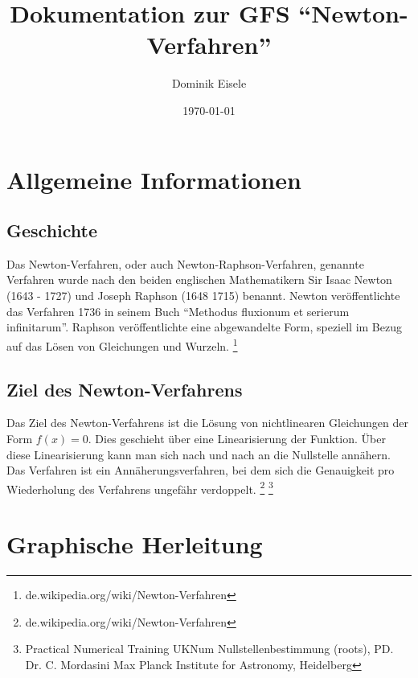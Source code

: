 \documentclass[a4paper,12pt,fleqn,oneside]{article}
\author{Dominik Eisele}
\title{Dokumentation zur GFS "`Newton-Verfahren"'}
\date{\today}
\begin{document}
\normalem

\begin{titlepage}
	\maketitle
\end{titlepage}

\tableofcontents

\newpage

\section{Allgemeine Informationen}
	\subsection{Geschichte}
		Das Newton-Verfahren, oder auch Newton-Raphson-Verfahren, genannte Verfahren wurde nach den beiden englischen Mathematikern Sir 
		Isaac Newton (1643 - 1727) und Joseph Raphson (1648 1715) benannt. Newton veröffentlichte das Verfahren 1736 in seinem Buch
		"`Methodus fluxionum et serierum infinitarum"'. Raphson veröffentlichte eine abgewandelte Form, speziell im Bezug auf das Lösen von
		Gleichungen und Wurzeln.
 		\footnote{de.wikipedia.org/wiki/Newton-Verfahren}
		
	\subsection{Ziel des Newton-Verfahrens}
		Das Ziel des Newton-Verfahrens ist die Lösung von nichtlinearen Gleichungen der Form $f(x) = 0$. Dies geschieht über eine Linearisierung der
		Funktion. Über diese Linearisierung kann man sich nach und nach an die Nullstelle annähern.\\
		Das Verfahren ist ein Annäherungsverfahren, bei dem sich die Genauigkeit pro Wiederholung des Verfahrens ungefähr verdoppelt.
		\footnote{de.wikipedia.org/wiki/Newton-Verfahren}
		\footnote{Practical Numerical Training UKNum Nullstellenbestimmung (roots), PD. Dr. C. Mordasini Max Planck Institute for Astronomy, Heidelberg}
		
\newpage

\section{Graphische Herleitung}
	
\end{document}
